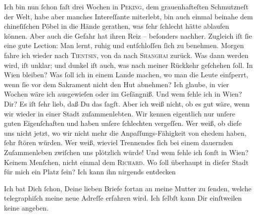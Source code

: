 \pstart
           Ich bin nun{ }ſchon faſt drei Wochen in \textsc{Peking}, dem grauenhafteſten Schmutzneſt der Welt, habe aber manches Intereſſante
               miterlebt, bin auch einmal beinahe dem chineſiſchen Pöbel in die Hände gerathen, was{ }ſehr{ }ſchlecht
               hätte ablaufen können. Aber auch die Gefahr hat ihren Reiz – beſonders \strikeout{\textcolor{gray}{×}\-\textcolor{gray}{×}\-\textcolor{gray}{×}} nachher. Zugleich iſt{ }ſie eine gute Lection: Man lernt, ruhig und entſchloſſen{ }ſich zu benehmen. Morgen fahre {\pb}ich wieder nach \textsc{Tientsin}, von da nach \textsc{Shanghai} zurück. Was dann werden wird, iſt unklar; und dunkel iſt auch, was nach meiner
               Rückkehr geſchehen{ }ſoll. In Wien bleiben? Was{ }ſoll
               ich in einem Lande machen, wo
               man die Leute einſperrt, wenn{ }ſie vor dem Sakrament nicht den Hut abnehmen? Ich
               glaube, in vier Wochen wäre ich ausgewieſen oder im Gefängniß. Und wem fehle ich in
                  Wien? Dir? Es iſt{ }ſehr lieb, daß Du das{ }ſagſt.
               Aber ich \strikeout{\textcolor{gray}{×}} weiß nicht, ob es gut wäre, wenn wir wieder in einer Stadt {\pb}zuſammenlebten. Wir kennen eigentlich nur unſere
               guten Eigenſchaften und haben unſere{ }ſchlechten vergeſſen. Wer weiß,  ob dieſe uns nicht jetzt, wo wir nicht mehr die
               Anpaſſungs-Fähigkeit von ehedem haben,{ }ſehr{ }ſtören  würden. Wer weiß,  wieviel
              Trennendes{ }ſich bei einem dauernden Zuſammenleben zwiſchen uns plötzlich \label{T_L02861-1v}\label{T_L02861-1}
               würde! Und wem fehle ich{ }ſonſt in Wien? Keinem
               Menſchen, nicht einmal dem \textsc{Richard}. Wo{ }ſoll überhaupt in dieſer Stadt für mich ein Platz{ }ſein? Ich kann ihn nirgends entdecken{\dotsfive}\pend
           
\pstart
           Ich  bat Dich{ }ſchon, Deine {\pb}lieben Briefe fortan
               an meine Mutter zu{ }ſenden,
               welche telegraphiſch meine neue Adreſſe erfahren wird. Ich{ }ſelbſt kann Dir
               einſtweilen keine angeben.\pend
           
